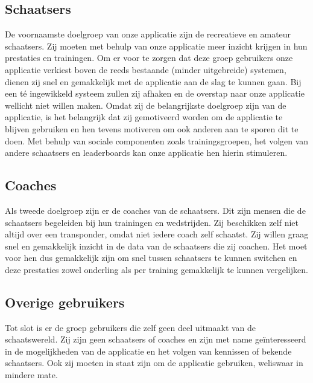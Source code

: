 \newcommand{\doelgroep}{}
\label{sec:doelgroep}

\subsection{Schaatsers}
De voornaamste doelgroep van onze applicatie zijn de recreatieve en amateur schaatsers. Zij moeten met behulp van onze applicatie meer inzicht krijgen in hun prestaties en trainingen. 
Om er voor te zorgen dat deze groep gebruikers onze applicatie verkiest boven de reeds bestaande (minder uitgebreide) systemen, dienen zij snel en gemakkelijk met de applicatie aan de slag te kunnen gaan.
Bij een té ingewikkeld systeem zullen zij afhaken en de overstap naar onze applicatie wellicht niet willen maken.
Omdat zij de belangrijkste doelgroep zijn van de applicatie, is het belangrijk dat zij gemotiveerd worden om de applicatie te blijven gebruiken en hen tevens motiveren om ook anderen aan te sporen dit te doen.
Met behulp van sociale componenten zoals trainingsgroepen, het volgen van andere schaatsers en leaderboards kan onze applicatie hen hierin stimuleren.
\subsection{Coaches}
Als tweede doelgroep zijn er de coaches van de schaatsers. Dit zijn mensen die de schaatsers begeleiden bij hun trainingen en wedstrijden. Zij beschikken zelf niet altijd over een transponder, omdat niet iedere coach zelf schaatst.
Zij willen graag snel en gemakkelijk inzicht in de data van de schaatsers die zij coachen. Het moet voor hen dus gemakkelijk zijn om snel tussen schaatsers te kunnen switchen en deze prestaties zowel onderling als per training gemakkelijk te kunnen vergelijken.
\subsection{Overige gebruikers}
Tot slot is er de groep gebruikers die zelf geen deel uitmaakt van de schaatswereld. Zij zijn geen schaatsers of coaches en zijn met name geïnteresseerd in de mogelijkheden van de applicatie en het volgen van kennissen of bekende schaatsers.
Ook zij moeten in staat zijn om de applicatie gebruiken, weliswaar in mindere mate.